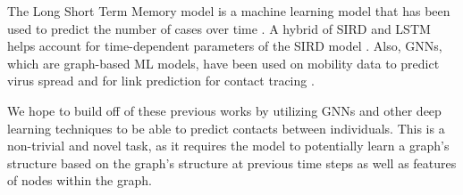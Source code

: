 \documentclass[times, 10pt,twocolumn]{article}
\begin{document}
The Long Short Term Memory model is a machine learning model that has been used to predict the number of cases over time \cite{SEIRD-LSTM}. A hybrid of SIRD and LSTM helps account for time-dependent parameters of the SIRD model \cite{SIRD-LSTM-hybrid}. Also, GNNs, which are graph-based ML models, have been used on mobility data to predict virus spread and for link prediction for contact tracing \cite{positivity-hospitalization-GNN}\cite{contact-tracing-GNN}.

We hope to build off of these previous works by utilizing GNNs and other deep learning techniques to be able to predict contacts between individuals. This is a non-trivial and novel task, as it requires the model to potentially learn a graph's structure based on the graph's structure at previous time steps as well as features of nodes within the graph.






\end{document}
